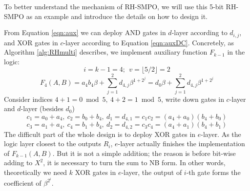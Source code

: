 To better understand the mechanism of RH-SMPO, we will use this 5-bit 
RH-SMPO as an example and introduce the details on how to design it.
\begin{Example}
From Equation \ref{eqn:aux} we can deploy AND gates in $d$-layer according to $d_{i,j}$,
and XOR gates in $c$-layer according to Equation \ref{eqn:auxDC}. Concretely, as Algorithm \ref{alg:RHmulti}
describes, we implement auxiliary function $F_{k-1}$ in the logic:
$$i = k-1 = 4;~~v=\lfloor 5/2 \rfloor = 2$$
\begin{equation}
\label{eqn:5bitRHaux}
F_{4}(A,B) = a_4b_4\beta+\sum_{j=1}^2 d_{4,j}\beta^{1+2^j} = d_0\beta+\sum_{j=1}^2 d_{4,j}\beta^{1+2^j}
\end{equation}
Consider indices $4+1=0\bmod 5,~4+2=1\bmod 5$, write down gates in $c$-layer and $d$-layer (besides $d_0$)
$$c_1 = a_0+a_4,~c_2 = b_0+b_4,~d_1=d_{4,1}= c_1c_2 = (a_4+a_0)(b_4+b_0)$$
$$c_3 = a_1+a_4,~c_4 = b_1+b_4,~d_2=d_{4,2}= c_3c_4 = (a_4+a_1)(b_4+b_1)$$
The difficult part of the whole design is to deploy XOR gates in $e$-layer. 
As the logic layer closest to the outputs $R_i$, $e$-layer actually finishes the implementation of 
$F_{k-1}(A,B)$. But it is not a simple addition; the reason is before bit-wise adding to $X^2$, it is necessary to 
turn the sum to NB form. In other words, theoretically we need $k$ XOR gates in $e$-layer, the output of 
$i$-th gate forms the coefficient of $\beta^{2^i}$.


\end{Example}
